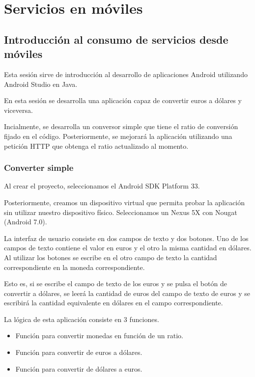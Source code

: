 \chapter{Servicios en móviles}\label{chap:7}
\section{Introducción al consumo de servicios desde móviles}
Esta sesión sirve de introducción al desarrollo de aplicaciones Android
utilizando Android Studio en Java.

En esta sesión se desarrolla una aplicación capaz de convertir euros
a dólares y viceversa.

Incialmente, se desarrolla un conversor simple que tiene el ratio de
conversión fijado en el código.
Posteriormente, se mejorará la aplicación utilizando una petición HTTP
que obtenga el ratio actualizado al momento.

\subsection{Converter simple}
Al crear el proyecto, seleccionamos el Android SDK Platform 33.

Posteriormente, creamos un dispositivo virtual que permita probar la
aplicación sin utilizar nuestro dispositivo físico.
Seleccionamos un Nexus 5X con Nougat (Android 7.0).

La interfaz de usuario consiste en dos campos de texto y dos botones.
Uno de los campos de texto contiene el valor en euros
y el otro la misma cantidad en dólares.
Al utilizar los botones se escribe en el otro campo de texto la cantidad
correspondiente en la moneda correspondiente.

Esto es, si se escribe el campo de texto de los euros
y se pulsa el botón de convertir a dólares,
se leerá la cantidad de euros del campo de texto de euros
y se escribirá la cantidad equivalente en dólares en el campo correspondiente.

La lógica de esta aplicación consiste en 3 funciones.

\begin{itemize}
    \item Función para convertir monedas en función de un ratio.
    \item Función para convertir de euros a dólares.
    \item Función para convertir de dólares a euros.
\end{itemize}

